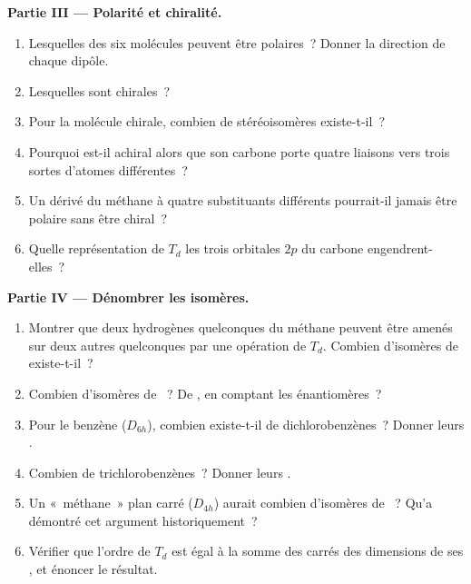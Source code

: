 \begin{problem}
\medskip\noindent\textbf{Partie III --- Polarité et chiralité.}
\begin{enumerate}[resume]
  \item Lesquelles des six molécules peuvent être polaires~? Donner la
        direction de chaque dipôle.
  \item Lesquelles sont chirales~?
  \item Pour la molécule chirale, combien de stéréoisomères existe-t-il~?
  \item Pourquoi  est-il achiral alors que son carbone porte
        quatre liaisons vers trois sortes d'atomes différentes~?
  \item Un dérivé du méthane à quatre substituants différents pourrait-il
        jamais être polaire sans être chiral~?
  \item Quelle représentation de $T_d$ les trois orbitales $2p$ du carbone
        engendrent-elles~?
\end{enumerate}

\medskip\noindent\textbf{Partie IV --- Dénombrer les isomères.}
\begin{enumerate}[resume]
  \item Montrer que deux hydrogènes quelconques du méthane peuvent être
        amenés sur deux autres quelconques par une opération de $T_d$.
        Combien d'isomères de  existe-t-il~?
  \item Combien d'isomères de ~? De , en comptant
        les énantiomères~?
  \item Pour le benzène ($D_{6h}$), combien existe-t-il de
        dichlorobenzènes~? Donner leurs .
  \item Combien de trichlorobenzènes~? Donner leurs .
  \item Un «~méthane~» plan carré ($D_{4h}$) aurait combien d'isomères de
        ~? Qu'a démontré cet argument historiquement~?
  \item Vérifier que l'ordre de $T_d$ est égal à la somme des carrés des
        dimensions de ses , et énoncer le
        résultat.
\end{enumerate}
\end{problem}
